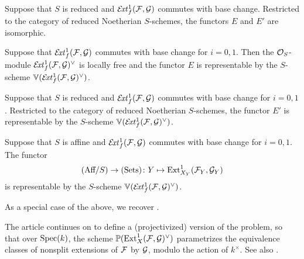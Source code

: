 \begin{proposition}
	Suppose that $S$ is reduced and $\mathcal{E}\!\mathit{xt}^1_f(\mathcal{F},\mathcal{G})$ commutes with base change. Restricted to the category of reduced Noetherian $S$-schemes, the functors $E$ and $E'$ are isomorphic.
\end{proposition}

\begin{proposition}
	Suppose that $\mathcal{E}\!\mathit{xt}^1_f(\mathcal{F},\mathcal{G})$ commutes with base change for $i=0,1$. Then the $\mathcal{O}_S$-module $\mathcal{E}\!\mathit{xt}^1_f(\mathcal{F},\mathcal{G})^\vee$ is locally free and the functor $E$ is representable by the $S$-scheme $\mathbb{V}(\mathcal{E}\!\mathit{xt}^1_f(\mathcal{F},\mathcal{G})^\vee)$.
\end{proposition}

\begin{corollary}
	Suppose that $S$ is reduced and $\mathcal{E}\!\mathit{xt}^1_f(\mathcal{F},\mathcal{G})$ commutes with base change for $i=0,1$. Restricted to the category of reduced Noetherian $S$-schemes, the functor $E'$ is representable by the $S$-scheme $\mathbb{V}(\mathcal{E}\!\mathit{xt}^1_f(\mathcal{F},\mathcal{G})^\vee)$.
\end{corollary}

\begin{corollary}
	Suppose that $S$ is affine and $\mathcal{E}\!\mathit{xt}^1_f(\mathcal{F},\mathcal{G})$ commutes with base change for $i=0,1$. The functor
	\[
		(\textup{Aff}/{S}) \to (\textup{Sets})
		\colon
		Y \mapsto \operatorname{Ext}^1_{X_Y}(\mathcal{F}_Y,\mathcal{G}_Y)
	\]
	is representable by the $S$-scheme $\mathbb{V}(\mathcal{E}\!\mathit{xt}^1_f(\mathcal{F},\mathcal{G})^\vee)$.
\end{corollary}

\begin{remark}
As a special case of the above, we recover .
\end{remark}

\begin{remark}
	The article \cite{lange-universal-extensions} continues on to define a (projectivized) version of the problem, so that over $\operatorname{Spec}(k)$, the scheme $\mathbb{P}(\operatorname{Ext}^1_X(\mathcal{F},\mathcal{G})^\vee)$ parametrizes the equivalence classes of nonsplit extensions of $\mathcal{F}$ by $\mathcal{G}$, modulo the action of $k^{\times}$. See also \cite[Example 2.1.12]{huybrechts-lehn-sheaves}.
\end{remark}

